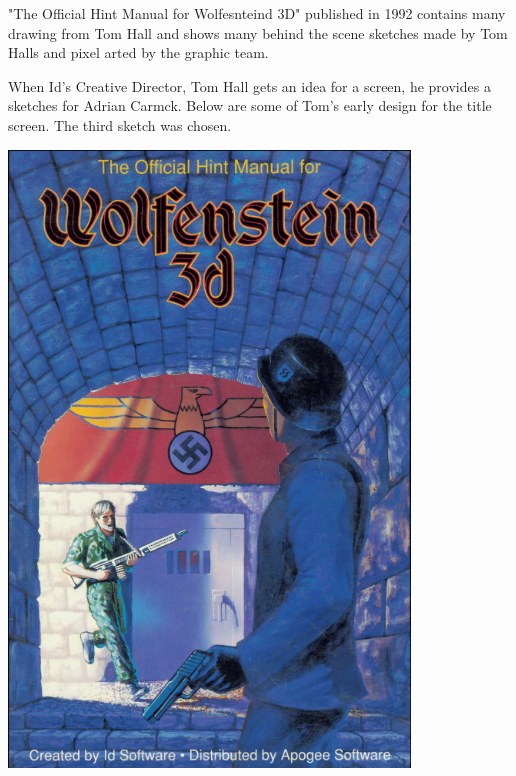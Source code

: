 \documentclass[book.tex]{subfiles}
\begin{document}
\begin{minipage}{0.7\textwidth}
"The Official Hint Manual for Wolfesnteind 3D" published in 1992 contains many drawing from Tom Hall and shows many behind the scene sketches made by Tom Halls and pixel arted by the graphic team.\\
\par
 \begin{fancyquotes}
When Id's Creative Director, Tom Hall gets an idea for a screen, he provides a sketches for Adrian Carmck. Below are some of Tom's early design for the title screen. The third sketch was chosen.\\

\end{fancyquotes}
\end{minipage}
\begin{minipage}{0.3\textwidth}
\begin{flushright}
\includegraphics[width=0.8\textwidth]{imgs/hint_manual_cover.png}
\end{flushright}
\end{minipage}
\noindent
\end{document}
